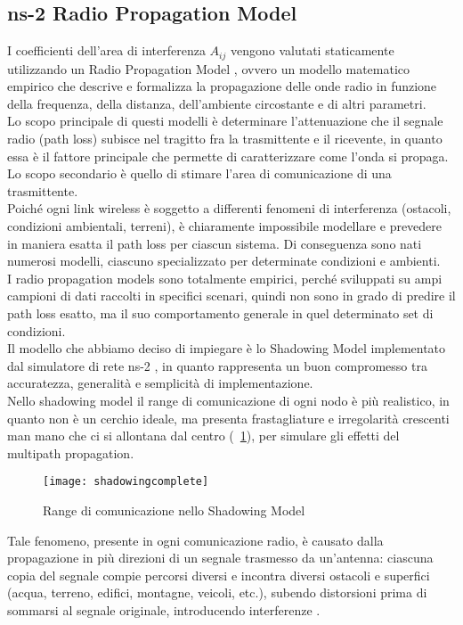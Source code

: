 \subsection{ns-2 Radio Propagation Model}
I coefficienti dell'area di interferenza $A_{ij}$ vengono valutati staticamente utilizzando un Radio Propagation Model \cite{seybold2005introduction}, ovvero un modello matematico empirico che descrive e formalizza la propagazione delle onde radio in funzione della frequenza, della distanza, dell'ambiente circostante e di altri parametri. \\
Lo scopo principale di questi modelli è determinare l'attenuazione che il segnale radio (path loss) subisce nel tragitto fra la trasmittente e il ricevente, in quanto essa è il fattore principale che permette di caratterizzare come l'onda si propaga. Lo scopo secondario è quello di stimare l'area di comunicazione di una trasmittente.\\
Poiché ogni link wireless è soggetto a differenti fenomeni di interferenza (ostacoli, condizioni ambientali, terreni), è chiaramente impossibile modellare e prevedere in maniera esatta il path loss per ciascun sistema. Di conseguenza sono nati numerosi modelli, ciascuno specializzato per determinate condizioni e ambienti. \\
I radio propagation models sono totalmente empirici, perché sviluppati su ampi campioni di dati raccolti in specifici scenari, quindi non sono in grado di predire il path loss esatto, ma il suo comportamento generale in quel determinato set di condizioni.  \\
Il modello che abbiamo deciso di impiegare è lo Shadowing Model implementato dal simulatore di rete ns-2 \cite{nsMan}, in quanto rappresenta un buon compromesso tra accuratezza, generalità e semplicità di implementazione. \\
Nello shadowing model il range di comunicazione di ogni nodo è più realistico, in quanto non è un cerchio ideale, ma presenta frastagliature e irregolarità crescenti man mano che ci si allontana dal centro (\figurename\ \ref{fig:shadowing}), per simulare gli effetti del multipath propagation. \\
%
\begin{figure}[!h]
	\begin{center}
		\texttt{[image: shadowingcomplete]}
	\end{center}
	\caption{Range di comunicazione nello Shadowing Model\label{fig:shadowing}}
\end{figure}
%
Tale fenomeno, presente in ogni comunicazione radio, è causato dalla propagazione in più direzioni di un segnale trasmesso da un'antenna: ciascuna copia del segnale compie percorsi diversi e incontra diversi ostacoli e superfici (acqua, terreno, edifici, montagne, veicoli, etc.), subendo distorsioni prima di sommarsi al segnale originale, introducendo interferenze \cite{umar2004mobile}. \\
